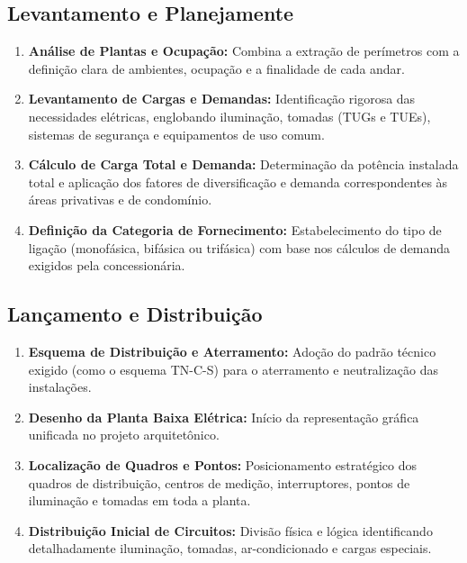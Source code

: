 \documentclass[12pt,openright,oneside,a4paper,brazil]{abntex2}
\begin{document}
\subsection{Levantamento e Planejamente}
\begin{enumerate}
    \item \textbf{Análise de Plantas e Ocupação: } Combina a extração de perímetros com a definição clara de ambientes, ocupação e a finalidade de cada andar.
    
    \item \textbf{Levantamento de Cargas e Demandas: } Identificação rigorosa das necessidades elétricas, englobando iluminação, tomadas (TUGs e TUEs), sistemas de segurança e equipamentos de uso comum.
    
    \item \textbf{Cálculo de Carga Total e Demanda: } Determinação da potência instalada total e aplicação dos fatores de diversificação e demanda correspondentes às áreas privativas e de condomínio.
    
    \item \textbf{Definição da Categoria de Fornecimento: } Estabelecimento do tipo de ligação (monofásica, bifásica ou trifásica) com base nos cálculos de demanda exigidos pela concessionária.
\end{enumerate}

\subsection{Lançamento e Distribuição}
\begin{enumerate}[start=5]
    \item \textbf{Esquema de Distribuição e Aterramento: } Adoção do padrão técnico exigido (como o esquema TN-C-S) para o aterramento e neutralização das instalações.
    
    \item \textbf{Desenho da Planta Baixa Elétrica: } Início da representação gráfica unificada no projeto arquitetônico.
    
    \item \textbf{Localização de Quadros e Pontos: } Posicionamento estratégico dos quadros de distribuição, centros de medição, interruptores, pontos de iluminação e tomadas em toda a planta.
    
    \item \textbf{Distribuição Inicial de Circuitos: } Divisão física e lógica identificando detalhadamente iluminação, tomadas, ar-condicionado e cargas especiais.
\end{enumerate}
\end{document}
